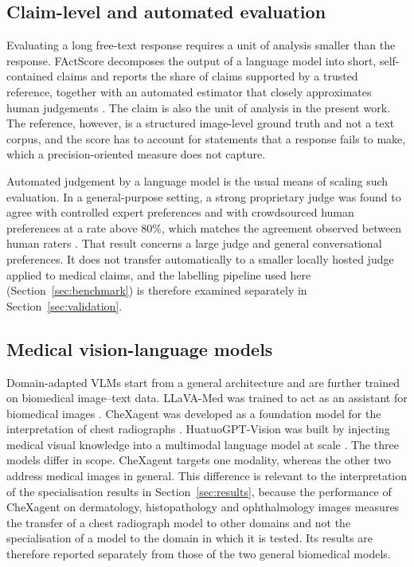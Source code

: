 \documentclass[11pt,a4paper]{article}
\begin{document}
\subsection{Claim-level and automated evaluation}
\label{subsec:rw_claims}

Evaluating a long free-text response requires a unit of analysis smaller than the response. FActScore decomposes the output of a language model into short, self-contained claims and reports the share of claims supported by a trusted reference, together with an automated estimator that closely approximates human judgements \citep{min2023factscore}. The claim is also the unit of analysis in the present work. The reference, however, is a structured image-level ground truth and not a text corpus, and the score has to account for statements that a response fails to make, which a precision-oriented measure does not capture.

Automated judgement by a language model is the usual means of scaling such evaluation. In a general-purpose setting, a strong proprietary judge was found to agree with controlled expert preferences and with crowdsourced human preferences at a rate above 80\%, which matches the agreement observed between human raters \citep{zheng2023judge}. That result concerns a large judge and general conversational preferences. It does not transfer automatically to a smaller locally hosted judge applied to medical claims, and the labelling pipeline used here (Section~\ref{sec:benchmark}) is therefore examined separately in Section~\ref{sec:validation}.

\subsection{Medical vision-language models}
\label{subsec:rw_medvlm}

Domain-adapted VLMs start from a general architecture and are further trained on biomedical image--text data. LLaVA-Med was trained to act as an assistant for biomedical images \citep{li2023llavamed}. CheXagent was developed as a foundation model for the interpretation of chest radiographs \citep{chen2024chexagent}. HuatuoGPT-Vision was built by injecting medical visual knowledge into a multimodal language model at scale \citep{chen2024huatuogptvision}. The three models differ in scope. CheXagent targets one modality, whereas the other two address medical images in general. This difference is relevant to the interpretation of the specialisation results in Section~\ref{sec:results}, because the performance of CheXagent on dermatology, histopathology and ophthalmology images measures the transfer of a chest radiograph model to other domains and not the specialisation of a model to the domain in which it is tested. Its results are therefore reported separately from those of the two general biomedical models.
\end{document}
